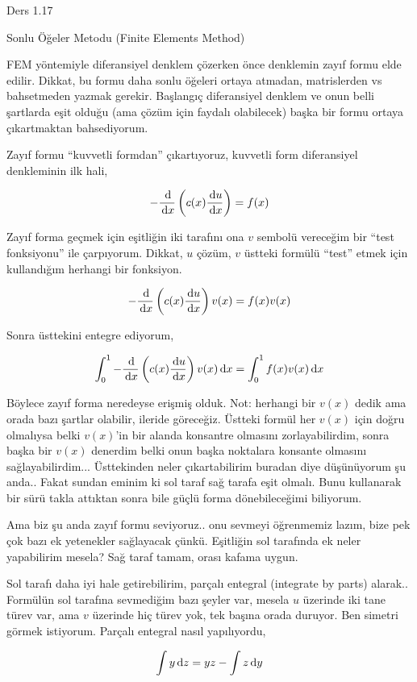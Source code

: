 \documentclass[12pt,fleqn]{article}\usepackage{../../common}
\begin{document}
Ders 1.17

Sonlu Öğeler Metodu (Finite Elements Method)

FEM yöntemiyle diferansiyel denklem çözerken önce denklemin zayıf formu elde
edilir. Dikkat, bu formu daha sonlu öğeleri ortaya atmadan, matrislerden vs
bahsetmeden yazmak gerekir. Başlangıç diferansiyel denklem ve onun belli
şartlarda eşit olduğu (ama çözüm için faydalı olabilecek) başka bir formu
ortaya çıkartmaktan bahsediyorum. 

Zayıf formu ``kuvvetli formdan'' çıkartıyoruz, kuvvetli form diferansiyel
denkleminin ilk hali,

$$
- \frac{\,\mathrm{d}}{\,\mathrm{d} x} \left( c(x) \frac{\,\mathrm{d} u}{\,\mathrm{d} x} \right) = f(x)
$$

Zayıf forma geçmek için eşitliğin iki tarafını ona $v$ sembolü vereceğim bir
``test fonksiyonu'' ile çarpıyorum. Dikkat, $u$ çözüm, $v$ üstteki formülü
``test'' etmek için kullandığım herhangi bir fonksiyon. 

$$
- \frac{\,\mathrm{d}}{\,\mathrm{d} x} \left( c(x) \frac{\,\mathrm{d} u}{\,\mathrm{d} x} \right) v(x) =
f(x) v(x)
$$

Sonra üsttekini entegre ediyorum,

$$
\int_{0}^{1} - \frac{\,\mathrm{d}}{\,\mathrm{d} x} \left( c(x) \frac{\,\mathrm{d} u}{\,\mathrm{d} x} \right) v(x) \,\mathrm{d} x=
\int_{0}^{1} f(x) v(x) \,\mathrm{d} x
$$

Böylece zayıf forma neredeyse erişmiş olduk. Not: herhangi bir $v(x)$ dedik ama
orada bazı şartlar olabilir, ileride göreceğiz. Üstteki formül her $v(x)$ için
doğru olmalıysa belki $v(x)$'in bir alanda konsantre olmasını zorlayabilirdim,
sonra başka bir $v(x)$ denerdim belki onun başka noktalara konsante olmasını
sağlayabilirdim... Üsttekinden neler çıkartabilirim buradan diye düşünüyorum şu
anda.. Fakat sundan eminim ki sol taraf sağ tarafa eşit olmalı. Bunu kullanarak
bir sürü takla attıktan sonra bile güçlü forma dönebileceğimi biliyorum.

Ama biz şu anda zayıf formu seviyoruz.. onu sevmeyi öğrenmemiz lazım, bize pek
çok bazı ek yetenekler sağlayacak çünkü. Eşitliğin sol tarafında ek neler
yapabilirim mesela? Sağ taraf tamam, orası kafama uygun.

Sol tarafı daha iyi hale getirebilirim, parçalı entegral (integrate by parts)
alarak.. Formülün sol tarafına sevmediğim bazı şeyler var, mesela $u$ üzerinde
iki tane türev var, ama $v$ üzerinde hiç türev yok, tek başına orada duruyor.
Ben simetri görmek istiyorum. Parçalı entegral nasıl yapılıyordu,

$$ \int y \,\mathrm{d} z = y  z - \int z \,\mathrm{d} y $$
\end{document}
